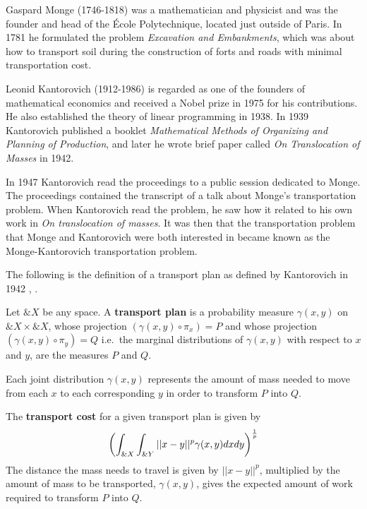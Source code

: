 Gaspard Monge (1746-1818) was a mathematician and physicist and was
the founder and head of the \'Ecole Polytechnique, located just
outside of Paris. In 1781 he formulated the problem \textit{Excavation
  and Embankments}, which was about how to transport soil during the
construction of forts and roads with minimal transportation cost.

Leonid Kantorovich (1912-1986) is regarded as one of the founders of
mathematical economics and received a Nobel prize in 1975 for his
contributions.  He also established the theory of linear programming
in 1938. In 1939 Kantorovich published a booklet \textit{Mathematical
  Methods of Organizing and Planning of Production}, and later he wrote
brief paper called \textit{On Translocation of Masses} in 1942.

In 1947 Kantorovich read the proceedings to a public session dedicated
to Monge.  The proceedings contained the transcript of a talk about
Monge's transportation problem. When Kantorovich read the problem, he
saw how it related to his own work in \textit{On translocation of
  masses}. It was then that the transportation problem that Monge and
Kantorovich were both interested in became known as the
Monge-Kantorovich transportation problem.

The following is the definition of a transport plan as defined by
Kantorovich in 1942 \cite{ref:kantorovich-1942},
\cite{ref:vershik-2013}.

\begin{definition}
  Let $\&X$ be any space. A \textbf{transport plan} is a probability
  measure $\gamma(x, y)$ on $\&X \times \&X$, whose projection
  $(\gamma(x, y) \circ \pi_{x}) = P$ and whose projection
  $(\gamma(x, y) \circ \pi_{y}) = Q$ i.e.\ the marginal distributions
  of $\gamma(x, y)$ with respect to $x$ and $y$, are the measures $P$
  and $Q$.
\end{definition}

\begin{remark}
  Each joint distribution $\gamma(x, y)$ represents the amount of mass
  needed to move from each $x$ to each corresponding $y$ in order to
  transform $P$ into $Q$.
\end{remark}

\begin{definition} The \textbf{transport cost} for a given transport
  plan is given by
  \begin{align}
    \label{eq:expected-work}
    \left(\int_{\&X}\int_{\&Y}||x-y||^p\gamma(x, y)dxdy \right)^{1 \over p}
  \end{align}
  The distance the mass needs to travel is given by $||x-y||^p$,
  multiplied by the amount of mass to be transported, $\gamma(x, y)$,
  gives the expected amount of work required to transform $P$ into
  $Q$.
\end{definition}


